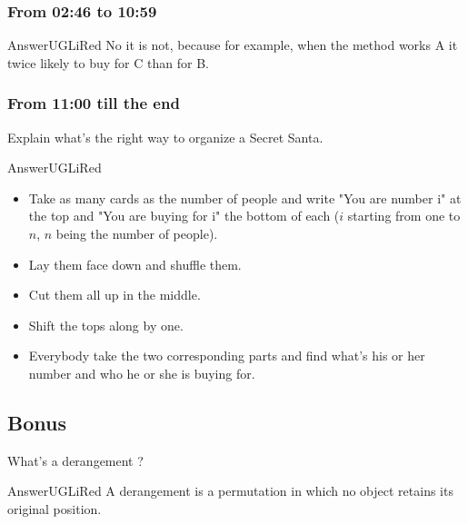 \documentclass[12pt,a4paper,article,english,firamath]{nsi}
\begin{document}
\subsubsection*{From 02:46 to 10:59}

\begin{encadrecolore}{Answer}{UGLiRed}
    No it is not, because for example, when the method works A it twice likely to buy for C than for B.
\end{encadrecolore}
\subsubsection*{From 11:00 till the end}
Explain what's the right way to organize a Secret Santa.
\begin{encadrecolore}{Answer}{UGLiRed}
\begin{itemize}
    \item Take as many cards as the number of people and write "You are number i" at the top and "You are buying for i" the bottom of each ($i$ starting from one to $n$, $n$ being the number of people). 
    \item Lay them face down and shuffle them.
    \item Cut them all up in the middle.
    \item Shift the tops along by one.
    \item Everybody take the two corresponding parts and find what's his or her number and who he or she is buying for.
\end{itemize}
\end{encadrecolore}
\subsection*{Bonus}

What's a derangement ?
\begin{encadrecolore}{Answer}{UGLiRed}
    A derangement is a permutation in which no object retains its original position.
\end{encadrecolore}
\end{document}
